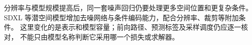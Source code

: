 分辨率与模型规模提高后，同一套噪声回归仍要处理更多空间位置和更复杂条件。
SDXL 等潜空间模型增加去噪网络与条件编码能力，配合分辨率、裁剪等附加条件。
这里变化的是表示和模型容量；前向路径、预测标签及采样调度仍应逐一核对，
不能只由模型名称判断它采用哪一个损失或求解器。
